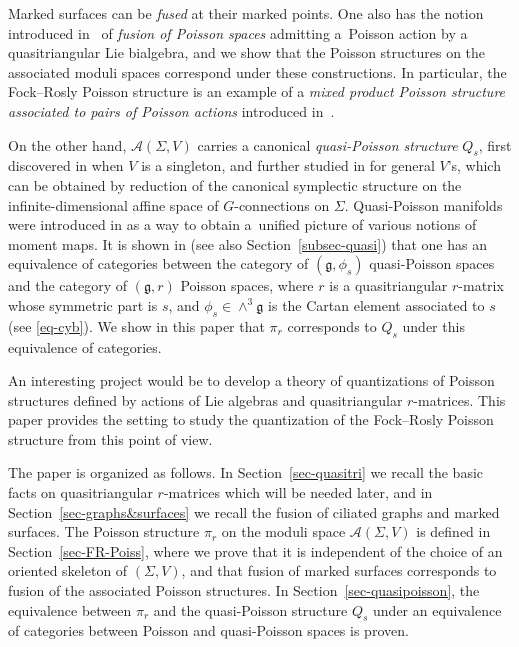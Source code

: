 \documentclass[10pt,a4paper]{amsart}
\numberwithin{equation}{section}
\def \g {\mathfrak{a}}
\def \g {\mathfrak{g}}
\def \A {{\mathcal{A}}}
\begin{document}
Marked surfaces can be {\it fused} at their marked points. One also has the notion introduced in~\cite{Lu-Mou:mixed} of {\it fusion of Poisson spaces} admitting a~Poisson action by a quasitriangular Lie bialgebra, and we show that the Poisson structures on the associated moduli spaces correspond under these constructions. In particular, the Fock--Rosly Poisson structure is an example of a {\it mixed product Poisson structure associated to pairs of Poisson actions} introduced in~\cite{Lu-Mou:mixed}.

On the other hand, $\A(\Sigma, V)$ carries a canonical {\it quasi-Poisson structure} $Q_s$, f\/irst discovered in \cite{mass-turaev} when $V$ is a singleton, and further studied in \cite{LBS1} for general $V$'s, which can be obtained by reduction of the canonical symplectic structure on the inf\/inite-dimensional af\/f\/ine space of $G$-connections on $\Sigma$. Quasi-Poisson manifolds were introduced in \cite{Anton-Yvette, AA} as a way to obtain a~unif\/ied picture of various notions of moment maps. It is shown in \cite{Anton-Yvette, David-Severa:quasi-Hamiltonian-groupoids, Lu-Mou:mixed} (see also Section~\ref{subsec-quasi}) that one has an equivalence of categories between the category of $(\g, \phi_s)$ quasi-Poisson spaces and the category of $(\g, r)$ Poisson spaces, where $r$ is a quasitriangular $r$-matrix whose symmetric part is $s$, and $\phi_s \in \wedge^3 \g$ is the Cartan element associated to $s$ (see \eqref{eq-cyb}). We show in this paper that $\pi_r$ corresponds to $Q_s$ under this equivalence of categories.

An interesting project would be to develop a theory of quantizations of Poisson structures def\/ined by actions of Lie algebras and quasitriangular $r$-matrices. This paper provides the setting to study the quantization of the Fock--Rosly Poisson structure from this point of view.

The paper is organized as follows. In Section~\ref{sec-quasitri} we recall the basic facts on quasitriangular $r$-matrices which will be needed later, and in Section~\ref{sec-graphs&surfaces} we recall the fusion of ciliated graphs and marked surfaces. The Poisson structure $\pi_r$ on the moduli space $\A(\Sigma, V)$ is def\/ined in Section~\ref{sec-FR-Poiss}, where we prove that it is independent of the choice of an oriented skeleton of $(\Sigma, V)$, and that fusion of marked surfaces corresponds to fusion of the associated Poisson structures. In Section~\ref{sec-quasipoisson}, the equivalence between $\pi_r$ and the quasi-Poisson structure $Q_s$ under an equivalence of categories between Poisson and quasi-Poisson spaces is proven.
\end{document}
